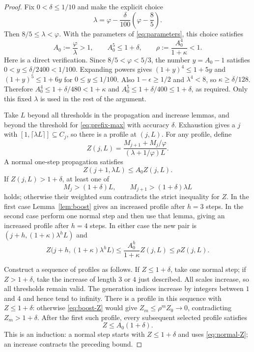 \documentclass[11pt,letterpaper]{article}
\numberwithin{equation}{section}
\theoremstyle{remark}
\newcommand{\ph}{\varphi}
\newcommand{\ceil}[1]{\lceil #1\rceil}
\begin{document}
\begin{proof}
Fix $0<\delta\le1/10$ and make the explicit choice
\[
 \lambda=\ph-\frac{\delta}{100}\left(\ph-\frac85\right).
\]
Then $8/5\le\lambda<\ph$. With the parameters of \eqref{eq:parameters},
this choice satisfies
\begin{equation}\label{eq:choose-lambda}
 A_0:=\frac\ph\lambda>1,\qquad A_0^5\le1+\delta,\qquad
 \rho:=\frac{A_0^4}{1+\kappa}<1.
\end{equation}
Here is a direct verification. Since $8/5<\ph<5/3$, the number
$y=A_0-1$ satisfies $0<y\le\delta/2400<1/100$.
Expanding powers gives $(1+y)^4\le1+5y$ and
$(1+y)^5\le1+6y$ for $0\le y\le1/100$.
Also $1-\epsilon\ge1/2$ and $\lambda^4<8$, so
$\kappa\ge\delta/128$. Therefore
$A_0^4\le1+\delta/480<1+\kappa$ and
$A_0^5\le1+\delta/400\le1+\delta$, as required.
Only this fixed $\lambda$ is used in the rest of the argument.

Take $L$ beyond all thresholds in the propagation and increase lemmas,
and beyond the threshold for \eqref{eq:prefix-max} with accuracy $\delta$.
Exhaustion gives a $j$ with $[1,\ceil{\lambda L}]\subseteq C_j$,
so there is a profile at $(j,L)$. For any profile, define
\[
 Z(j,L)=\frac{M_{j+1}+M_j/\ph}{(\lambda+1/\ph)L}.
\]
A normal one-step propagation satisfies
\begin{equation}\label{eq:normal-Z}
 Z(j+1,\lambda L)\le A_0 Z(j,L).
\end{equation}
If $Z(j,L)>1+\delta$, at least one of
\[
 M_j>(1+\delta)L,\qquad M_{j+1}>(1+\delta)\lambda L
\]
holds; otherwise their weighted sum contradicts the strict inequality
for $Z$. In the first case Lemma~\ref{lem:boost} gives an increased
profile after $h=3$ steps. In the second case perform one normal step
and then use that lemma, giving an increased profile after $h=4$ steps.
In either case the new pair is
$(j+h,(1+\kappa)\lambda^hL)$ and
\begin{equation}\label{eq:boost-Z}
 Z\bigl(j+h,(1+\kappa)\lambda^hL\bigr)
 \le\frac{A_0^h}{1+\kappa}Z(j,L)\le\rho Z(j,L).
\end{equation}

Construct a sequence of profiles as follows. If $Z\le1+\delta$, take
one normal step; if $Z>1+\delta$, take the increase of length $3$ or $4$
just described. All scales increase, so all thresholds remain valid.
The generation indices increase by integers between $1$ and $4$ and
hence tend to infinity. There is a profile in this sequence with
$Z\le1+\delta$: otherwise \eqref{eq:boost-Z} would give
$Z_m\le\rho^mZ_0\to0$, contradicting $Z_m>1+\delta$.
After the first such profile, every subsequent selected profile satisfies
\begin{equation}\label{eq:node-bound}
 Z\le A_0(1+\delta).
\end{equation}
This is an induction: a normal step starts with $Z\le1+\delta$ and
uses \eqref{eq:normal-Z}; an increase contracts the preceding bound.


\end{proof}
\end{document}
